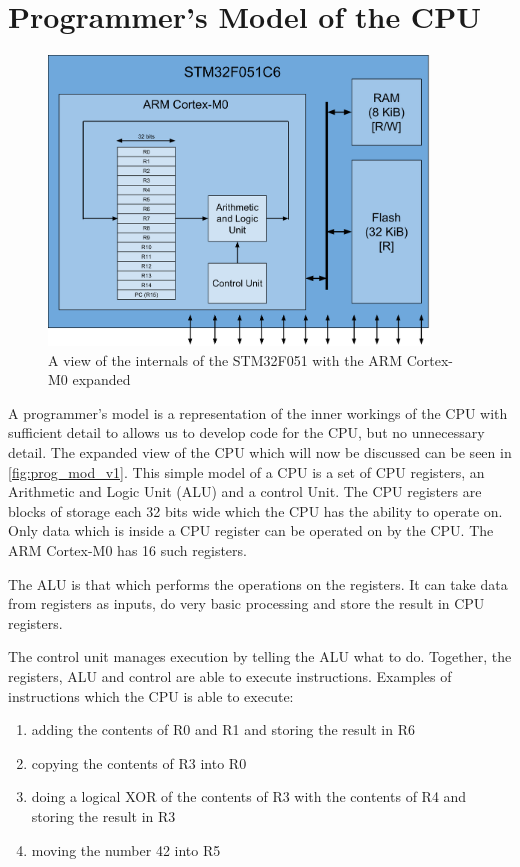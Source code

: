 \section{Programmer's Model of the CPU}
\begin{figure}[t]
  \centering
  \includegraphics[width=0.9\textwidth]{./week1/programmers_model_v1.pdf}
  \caption{A view of the internals of the STM32F051 with the ARM Cortex-M0 expanded}
  \label{fig:prog_mod_v1}
\end{figure}
A programmer's model is a representation of the inner workings of the CPU with sufficient detail to allows us to develop code for the CPU, but no unnecessary detail. The expanded view of the CPU which will now be discussed can be seen in \autoref{fig:prog_mod_v1}. This simple model of a CPU is a set of CPU registers, an Arithmetic and Logic Unit (ALU) and a control Unit. The CPU registers are blocks of storage each 32 bits wide which the CPU has the ability to operate on. Only data which is inside a CPU register can be operated on by the CPU. The ARM Cortex-M0 has 16 such registers. 

The ALU is that which performs the operations on the registers. It can take data from registers as inputs, do very basic processing and store the result in CPU registers. 

The control unit manages execution by telling the ALU what to do. Together, the registers, ALU and control are able to execute instructions. 
Examples of instructions which the CPU is able to execute:
\begin{enumerate}
  \item adding the contents of R0 and R1 and storing the result in R6
  \item copying the contents of R3 into R0
  \item doing a logical XOR of the contents of R3 with the contents of R4 and storing the result in R3
  \item moving the number 42 into R5
\end{enumerate}


